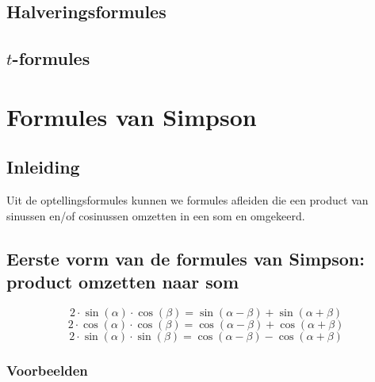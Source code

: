 \documentclass[a4paper,12pt]{article}
\begin{document}
\subsection{Halveringsformules}

\subsection{$t$-formules}

\newpage
\section{Formules van Simpson}

\subsection{Inleiding}

Uit de optellingsformules kunnen we formules afleiden die een product van sinussen en/of cosinussen omzetten in een som en omgekeerd.
\subsection{Eerste vorm van de formules van Simpson: product omzetten naar som}
\[2\cdot \sin(\alpha)\cdot \cos(\beta)=\sin(\alpha-\beta)+\sin(\alpha+\beta)
\]
\[2\cdot \cos(\alpha)\cdot \cos(\beta)=\cos(\alpha-\beta)+\cos(\alpha+\beta)
\]
\[2\cdot \sin(\alpha)\cdot \sin(\beta)=\cos(\alpha-\beta)-\cos(\alpha+\beta)
\]

\subsubsection*{Voorbeelden}
\end{document}
